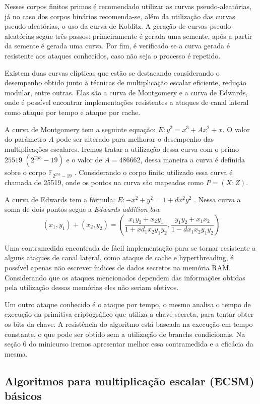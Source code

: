 Nesses corpos finitos primos é recomendado utilizar as curvas pseudo-aleatórias, já no caso dos corpos binários recomenda-se, além da utilização das curvas pseudo-aleatórias, o uso da curva de Koblitz. A geração de curvas pseudo-aleatórias segue três passos: primeiramente é gerada uma semente, após a partir da semente é gerada uma curva. Por fim, é verificado se a curva gerada é resistente aos ataques conhecidos, caso não seja o processo é repetido.

Existem duas curvas elípticas que estão se destacando considerando o desempenho obtido junto à técnicas de multiplicação escalar eficiente, redução modular, entre outras. Elas são a curva de Montgomery e a curva de Edwards, onde é possível encontrar implementações resistentes a ataques de canal lateral como ataque por tempo e ataque por cache.

A curva de Montgomery tem a seguinte equação: $E: y^2 = x^3 + Ax^2 + x$. O valor do parâmetro $A$ pode ser alterado para melhorar o desempenho das multiplicações escalares. Iremos tratar a utilização dessa curva com o primo $25519$ $(2^{255}-19)$ e o valor de $A = 486662$, dessa maneira a curva é definida sobre o corpo $\mathbb{F}_{2^{255}-19}$ \cite{Dull:2015:HCM:2834659.2834708}. Considerando o corpo finito utilizado essa curva é chamada de 25519, onde os pontos na curva são mapeados como $P = (X : Z)$. 

A curva de Edwards tem a fórmula: $E: -x^2 + y^2 = 1 + dx^2y^2$ \cite{Bernstein2012}. Nessa curva a soma de dois pontos segue a \textit{Edwards addition law}:
$$ (x_1,y_1) + (x_2,y_2) = (\frac{x_1y_2 + x_2y_1}{1 + xd_1x_2y_1y_2},\frac{y_1y_2 + x_1x_2}{1 - dx_1x_2y_1y_2}) $$%

Uma contramedida encontrada de fácil implementação para se tornar resistente a alguns ataques de canal lateral, como ataque de cache e hyperthreading, é possível apenas não escrever índices de dados secretos na memória RAM. Considerando que os ataques mencionados dependem das informações obtidas pela utilização dessas memórias eles não seriam efetivos. 

Um outro ataque conhecido é o ataque por tempo, o mesmo analisa o tempo de execução da primitiva criptográfico que utiliza a chave secreta, para tentar obter os bits da chave. A resistência do algoritmo está baseada na execução em tempo constante, o que pode ser obtido sem a utilização de branchs condicionais. Na seção 6 do minicurso iremos apresentar melhor essa contramedida e a eficácia da mesma.

\subsection{Algoritmos para multiplicação escalar (ECSM) básicos}

